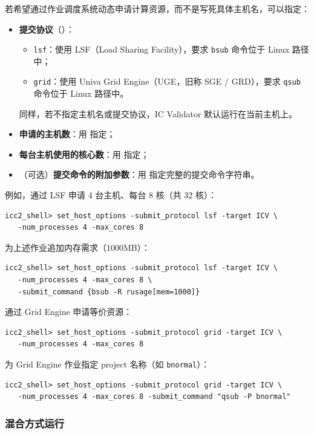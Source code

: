 若希望通过作业调度系统动态申请计算资源，而不是写死具体主机名，可以指定：
\begin{itemize}
  \item \textbf{提交协议}（）：
        \begin{itemize}
          \item \texttt{lsf}：使用 LSF（Load Sharing Facility），要求 \texttt{bsub} 命令位于 Linux 路径中；
          \item \texttt{grid}：使用 Univa Grid Engine（UGE，旧称 SGE / GRD），要求 \texttt{qsub} 命令位于 Linux 路径中。
        \end{itemize}
        同样，若不指定主机名或提交协议，IC Validator 默认运行在当前主机上。
  \item \textbf{申请的主机数}：用  指定；
  \item \textbf{每台主机使用的核心数}：用  指定；
  \item （可选）\textbf{提交命令的附加参数}：用  指定完整的提交命令字符串。
\end{itemize}

例如，通过 LSF 申请 4 台主机、每台 8 核（共 32 核）：
\begin{lstlisting}
icc2_shell> set_host_options -submit_protocol lsf -target ICV \
   -num_processes 4 -max_cores 8
\end{lstlisting}

为上述作业追加内存需求（1000MB）：
\begin{lstlisting}
icc2_shell> set_host_options -submit_protocol lsf -target ICV \
   -num_processes 4 -max_cores 8 \
   -submit_command {bsub -R rusage[mem=1000]}
\end{lstlisting}

通过 Grid Engine 申请等价资源：
\begin{lstlisting}
icc2_shell> set_host_options -submit_protocol grid -target ICV \
   -num_processes 4 -max_cores 8
\end{lstlisting}

为 Grid Engine 作业指定 project 名称（如 \texttt{bnormal}）：
\begin{lstlisting}
icc2_shell> set_host_options -submit_protocol grid -target ICV \
   -num_processes 4 -max_cores 8 -submit_command "qsub -P bnormal"
\end{lstlisting}

\subsubsection{混合方式运行}

